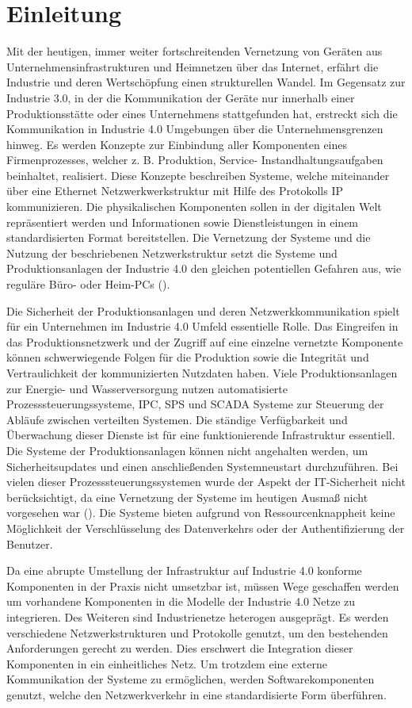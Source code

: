 \chapter{Einleitung}
Mit der heutigen, immer weiter fortschreitenden Vernetzung von Geräten aus Unternehmensinfrastrukturen und Heimnetzen über das Internet, erfährt die Industrie und deren Wertschöpfung einen strukturellen Wandel. Im Gegensatz zur Industrie 3.0, in der die Kommunikation der Geräte nur innerhalb einer Produktionsstätte oder eines Unternehmens stattgefunden hat, erstreckt sich die Kommunikation in Industrie 4.0 Umgebungen über die Unternehmensgrenzen hinweg. Es werden Konzepte zur Einbindung aller Komponenten eines Firmenprozesses, welcher z. B. Produktion, Service- Instandhaltungsaufgaben beinhaltet, realisiert. Diese Konzepte beschreiben Systeme, welche miteinander über eine Ethernet Netzwerkwerkstruktur mit Hilfe des Protokolls \ac{IP} kommunizieren. Die physikalischen Komponenten sollen in der digitalen Welt repräsentiert werden und Informationen sowie Dienstleistungen in einem standardisierten Format bereitstellen. Die Vernetzung der Systeme und die Nutzung der beschriebenen Netzwerkstruktur setzt die Systeme und Produktionsanlagen der Industrie 4.0 den gleichen potentiellen Gefahren aus, wie reguläre Büro- oder Heim-PCs (\cite{Halang2016}).

Die Sicherheit der Produktionsanlagen und deren Netzwerkkommunikation spielt für ein Unternehmen im Industrie 4.0 Umfeld essentielle Rolle. Das Eingreifen in das Produktionsnetzwerk und der Zugriff auf eine einzelne vernetzte Komponente können schwerwiegende Folgen für die Produktion sowie die Integrität und Vertraulichkeit der kommunizierten Nutzdaten haben. Viele Produktionsanlagen zur Energie- und Wasserversorgung nutzen automatisierte Prozesssteuerungssysteme, \ac{IPC}, \ac{SPS} und \ac{SCADA} Systeme zur Steuerung der Abläufe zwischen verteilten Systemen. Die ständige Verfügbarkeit und Überwachung dieser Dienste ist für eine funktionierende Infrastruktur essentiell. Die Systeme der Produktionsanlagen können nicht angehalten werden, um Sicherheitsupdates und einen anschließenden Systemneustart durchzuführen. Bei vielen dieser Prozesssteuerungssystemen wurde der Aspekt der IT-Sicherheit nicht berücksichtigt, da eine Vernetzung der Systeme im heutigen Ausmaß nicht vorgesehen war (\cite{Schleupner2016}). Die Systeme bieten aufgrund von Ressourcenknappheit keine Möglichkeit der Verschlüsselung des Datenverkehrs oder der Authentifizierung der Benutzer.

Da eine abrupte Umstellung der Infrastruktur auf Industrie 4.0 konforme Komponenten in der Praxis nicht umsetzbar ist, müssen Wege geschaffen werden um vorhandene Komponenten in die Modelle der Industrie 4.0 Netze zu integrieren. Des Weiteren sind Industrienetze heterogen ausgeprägt. Es werden verschiedene Netzwerkstrukturen und Protokolle genutzt, um den bestehenden Anforderungen gerecht zu werden. Dies erschwert die Integration dieser Komponenten in ein einheitliches Netz. Um trotzdem eine externe Kommunikation der Systeme zu ermöglichen, werden Softwarekomponenten genutzt, welche den Netzwerkverkehr in eine standardisierte Form überführen.


